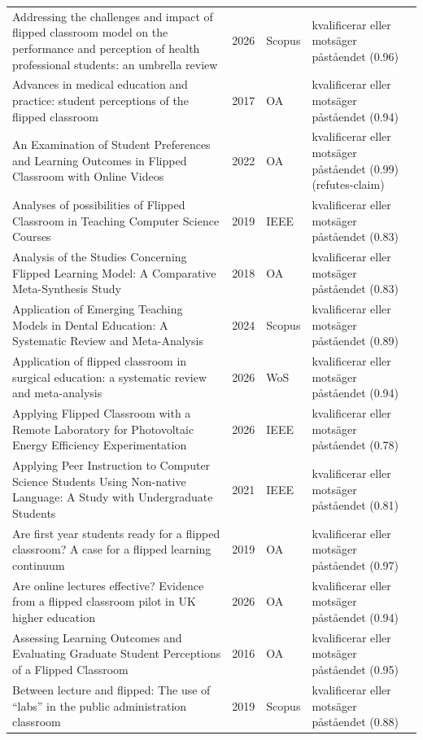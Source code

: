 \begin{longtable}{@{}%
  >{\raggedright\arraybackslash}p{}c%
  >{\raggedright\arraybackslash}p{}%
  >{\raggedright\arraybackslash}p{}@{}}
Addressing the challenges and impact of flipped classroom model on the performance and perception of health professional students: an umbrella review & 2026 & Scopus & kvalificerar eller motsäger påståendet (0.96) \\
Advances in medical education and practice: student perceptions of the flipped classroom & 2017 & OA & kvalificerar eller motsäger påståendet (0.94) \\
An Examination of Student Preferences and Learning Outcomes in Flipped Classroom with Online Videos & 2022 & OA & kvalificerar eller motsäger påståendet (0.99) (refutes-claim) \\
Analyses of possibilities of Flipped Classroom in Teaching Computer Science Courses & 2019 & IEEE & kvalificerar eller motsäger påståendet (0.83) \\
Analysis of the Studies Concerning Flipped Learning Model: A Comparative Meta-Synthesis Study & 2018 & OA & kvalificerar eller motsäger påståendet (0.83) \\
Application of Emerging Teaching Models in Dental Education: A Systematic Review and Meta-Analysis & 2024 & Scopus & kvalificerar eller motsäger påståendet (0.89) \\
Application of flipped classroom in surgical education: a systematic review and meta-analysis & 2026 & WoS & kvalificerar eller motsäger påståendet (0.94) \\
Applying Flipped Classroom with a Remote Laboratory for Photovoltaic Energy Efficiency Experimentation & 2026 & IEEE & kvalificerar eller motsäger påståendet (0.78) \\
Applying Peer Instruction to Computer Science Students Using Non-native Language: A Study with Undergraduate Students & 2021 & IEEE & kvalificerar eller motsäger påståendet (0.81) \\
Are first year students ready for a flipped classroom? A case for a flipped learning continuum & 2019 & OA & kvalificerar eller motsäger påståendet (0.97) \\
Are online lectures effective? Evidence from a flipped classroom pilot in UK higher education & 2026 & OA & kvalificerar eller motsäger påståendet (0.94) \\
Assessing Learning Outcomes and Evaluating Graduate Student Perceptions of a Flipped Classroom & 2016 & OA & kvalificerar eller motsäger påståendet (0.95) \\
Between lecture and flipped: The use of ``labs'' in the public administration classroom & 2019 & Scopus & kvalificerar eller motsäger påståendet (0.88) \\

\end{longtable}
